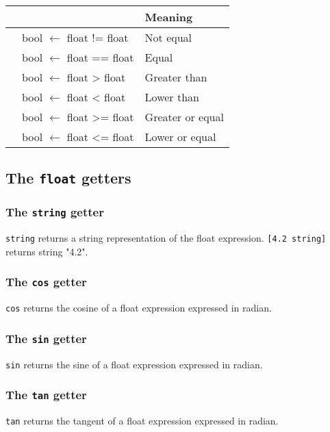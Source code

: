 \documentclass[10pt,openright,twosides,final]{memoir}
\newcommand{\scst}[1]{{\footnotesize\ttfamily\colorbox{light-blue}{"#1"}}}
\newcommand{\gtlinline}[1]{\colorbox{light-blue}{\lstinline[language=gtl]{#1}}}
\begin{document}
\begin{longtable}{>{\ttfamily}l|>{\ttfamily}l|l}
{\bfseries Operator}&{\bfseries Expression type}&{\bfseries Meaning}\\
\hline\endhead
 {!=}&
  {bool $\leftarrow$ float != float}&
  {Not equal}\\
 {==}&
  {bool $\leftarrow$ float == float}&
  {Equal}\\
 {>}&
  {bool $\leftarrow$ float > float}&
  {Greater than}\\
 {<}&
  {bool $\leftarrow$ float < float}&
  {Lower than}\\
 {>=}&
  {bool $\leftarrow$ float >= float}&
  {Greater or equal}\\
 {<=}&
  {bool $\leftarrow$ float <= float}&
  {Lower or equal}\\
\end{longtable}


\subsection{The \texttt{float} getters}

\subsubsection{The \texttt{string} getter}

\gtlinline{string} returns a string representation of the float expression. \gtlinline{[4.2 string]} returns string \scst{4.2}.
  
\subsubsection{The \texttt{cos} getter}

\gtlinline{cos} returns the cosine of a float expression expressed in radian.

\subsubsection{The \texttt{sin} getter}

\gtlinline{sin} returns the sine of a float expression expressed in radian.

\subsubsection{The \texttt{tan} getter}

\gtlinline{tan} returns the tangent of a float expression expressed in radian.
\end{document}
